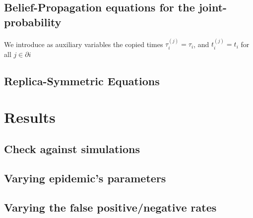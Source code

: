 \documentclass[a4paper, amsfonts, amssymb, amsmath, reprint, showkeys, nofootinbib, twoside, floatfix, pre,superscriptaddress]{revtex4-2}
\begin{document}
\subsection{Belief-Propagation equations for the joint-probability}
We introduce as auxiliary variables the copied times $\tau_i^{(j)}=\tau_i$, and $t_i^{(j)}=t_i$ for all $j\in\partial i$
\subsection{Replica-Symmetric Equations}
\section{Results}
\subsection{Check against simulations}
\subsection{Varying epidemic's parameters}
\subsection{Varying the false positive/negative rates}



\end{document}
